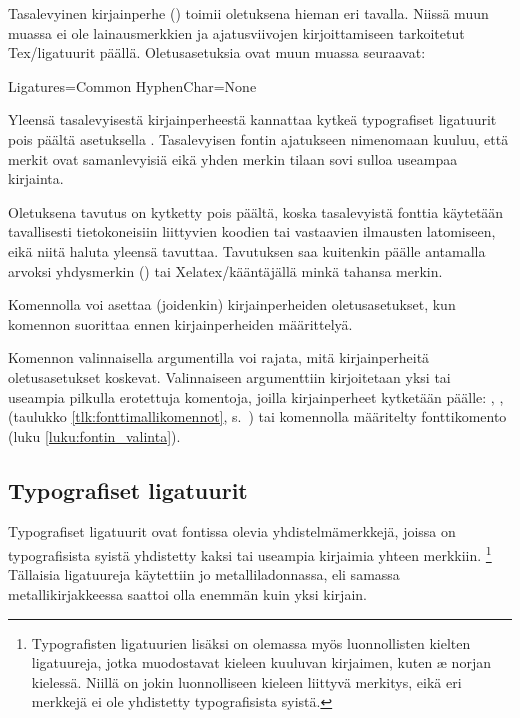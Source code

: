 Tasalevyinen%
 kirjainperhe () toimii oletuksena hieman eri tavalla. Niissä muun
muassa ei ole lainausmerkkien ja ajatusviivojen kirjoittamiseen
tarkoitetut Tex\-/ligatuurit päällä. Oletusasetuksia ovat muun muassa
seuraavat:

\begin{koodilohkosis}
  Ligatures=Common
  HyphenChar=None
\end{koodilohkosis}

Yleensä tasalevyisestä kirjainperheestä kannattaa kytkeä typografiset
ligatuurit pois päältä asetuksella .
Tasalevyisen fontin ajatukseen nimenomaan kuuluu, että merkit ovat
samanlevyisiä eikä yhden merkin tilaan sovi sulloa useampaa kirjainta.

Oletuksena tavutus on kytketty pois päältä, koska tasalevyistä fonttia
käytetään tavallisesti tietokoneisiin liittyvien koodien tai vastaavien
ilmausten latomiseen, eikä niitä haluta yleensä tavuttaa. Tavutuksen saa
kuitenkin päälle antamalla arvoksi yhdysmerkin
() tai Xelatex\-/kääntäjällä minkä
tahansa merkin.

Komennolla%
  voi asettaa (joidenkin) kirjainperheiden
oletusasetukset, kun komennon suorittaa ennen kirjainperheiden
määrittelyä.

\begin{koodilohkosis}
\end{koodilohkosis}

Komennon valinnaisella argumentilla voi rajata, mitä kirjainperheitä
oletusasetukset koskevat. Valinnaiseen argumenttiin kirjoitetaan yksi
tai useampia pilkulla erotettuja komentoja, joilla kirjainperheet
kytketään päälle: , ,
 (taulukko \ref{tlk:fonttimallikomennot},
s.~\pageref{tlk:fonttimallikomennot}) tai komennolla  määritelty fonttikomento (luku
\ref{luku:fontin_valinta}).

\subsection{Typografiset ligatuurit}
\label{luku:typo_liga}

Typografiset ligatuurit ovat fontissa olevia yhdistelmämerkkejä, joissa
on typografisista syistä yhdistetty kaksi tai useampia kirjaimia yhteen
merkkiin.%
\footnote{Typografisten ligatuurien lisäksi on olemassa myös
  luonnollisten kielten ligatuureja, jotka muodostavat kieleen kuuluvan
  kirjaimen, kuten æ norjan kielessä. Niillä on jokin luonnolliseen
  kieleen liittyvä merkitys, eikä eri merkkejä ei ole yhdistetty
  typografisista syistä.} Tällaisia ligatuureja käytettiin jo
metalliladonnassa, eli samassa metallikirjakkeessa saattoi olla enemmän
kuin yksi kirjain.

